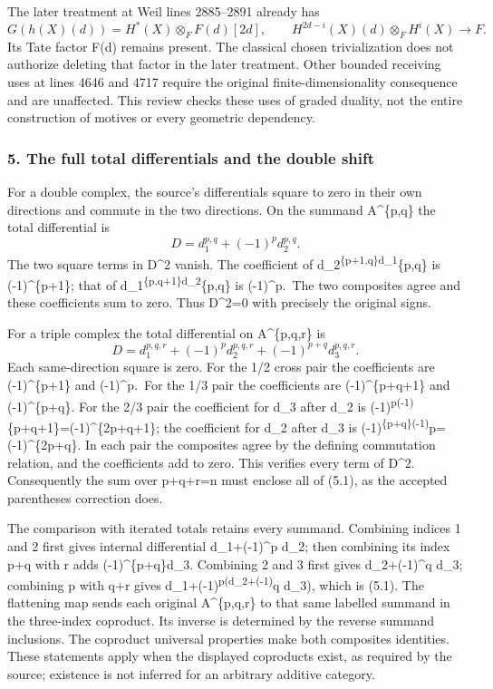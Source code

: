 The later treatment at Weil lines 2885--2891 already has \[
G(h(X)(d))=H^*(X)\otimes_F F(d)[2d],
\qquad
H^{2d-i}(X)(d)\otimes_F H^i(X)\longrightarrow F.
\] Its Tate factor F(d) remains present. The classical chosen trivialization does not authorize deleting that factor in the later treatment. Other bounded receiving uses at lines 4646 and 4717 require the original finite-dimensionality consequence and are unaffected. This review checks these uses of graded duality, not the entire construction of motives or every geometric dependency.

\subsubsection{5. The full total differentials and the double shift}\label{the-full-total-differentials-and-the-double-shift}

For a double complex, the source's differentials square to zero in their own directions and commute in the two directions. On the summand A\^{}\{p,q\} the total differential is \[
D=d_1^{p,q}+(-1)^p d_2^{p,q}.
\] The two square terms in D\^{}2 vanish. The coefficient of d\_2\textsuperscript{\{p+1,q\}d\_1}\{p,q\} is (-1)\^{}\{p+1\}; that of d\_1\textsuperscript{\{p,q+1\}d\_2}\{p,q\} is (-1)\^{}p.~The two composites agree and these coefficients sum to zero. Thus D\^{}2=0 with precisely the original signs.

For a triple complex the total differential on A\^{}\{p,q,r\} is \[
D=d_1^{p,q,r}+(-1)^p d_2^{p,q,r}
                    +(-1)^{p+q}d_3^{p,q,r}.              \tag{5.1}
\] Each same-direction square is zero. For the 1/2 cross pair the coefficients are (-1)\^{}\{p+1\} and (-1)\^{}p.~For the 1/3 pair the coefficients are (-1)\^{}\{p+q+1\} and (-1)\^{}\{p+q\}. For the 2/3 pair the coefficient for d\_3 after d\_2 is (-1)\textsuperscript{p(-1)}\{p+q+1\}=(-1)\^{}\{2p+q+1\}; the coefficient for d\_2 after d\_3 is (-1)\textsuperscript{\{p+q\}(-1)}p=(-1)\^{}\{2p+q\}. In each pair the composites agree by the defining commutation relation, and the coefficients add to zero. This verifies every term of D\^{}2. Consequently the sum over p+q+r=n must enclose all of (5.1), as the accepted parentheses correction does.

The comparison with iterated totals retains every summand. Combining indices 1 and 2 first gives internal differential d\_1+(-1)\^{}p d\_2; then combining its index p+q with r adds (-1)\^{}\{p+q\}d\_3. Combining 2 and 3 first gives d\_2+(-1)\^{}q d\_3; combining p with q+r gives d\_1+(-1)\textsuperscript{p(d\_2+(-1)}q d\_3), which is (5.1). The flattening map sends each original A\^{}\{p,q,r\} to that same labelled summand in the three-index coproduct. Its inverse is determined by the reverse summand inclusions. The coproduct universal properties make both composites identities. These statements apply when the displayed coproducts exist, as required by the source; existence is not inferred for an arbitrary additive category.

